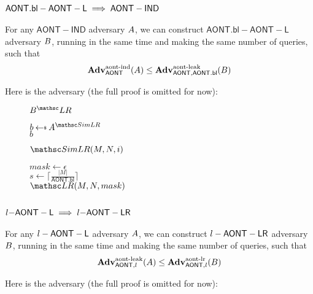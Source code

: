 \documentclass[11pt,twoside]{article}
\begin{document}
\subsection{$\mathsf{AONT.bl-AONT-L}\implies\mathsf{AONT-IND}$}

\begin{theorem}
For any $\mathsf{AONT-IND}$ adversary $A$, we can construct $\mathsf{AONT.bl-AONT-L}$ adversary $B$, running in the same time and making the same number of queries, such that $$\textbf{Adv}^\text{aont-ind}_{\mathsf{AONT}}(A)\le\textbf{Adv}^\text{aont-leak}_{\mathsf{AONT},\mathsf{AONT.bl}}(B)$$
\end{theorem}

Here is the adversary (the full proof is omitted for now):

\begin{figure}[H]
{
\underline{$\advB^\LRO$}

\begin{algorithm}[H]
$b\getsr \advA^{\procfont{SimLR}}$\\
\Return $b$
\end{algorithm}

\underline{$\procfont{SimLR}(M,N,i)$}

\begin{algorithm}[H]
$mask\gets \epsilon$\\
$s\gets \lceil\frac{|M|}{\mathsf{AONT.bl}}\rceil$\\
{
}
\Return $\LRO(M,N,mask)$
\end{algorithm}
}
\end{figure}

\subsection{$l\mathsf{-AONT-L}\implies l\mathsf{-AONT-LR}$}

\begin{theorem}
For any $l-\mathsf{AONT-L}$ adversary $A$, we can construct $l-\mathsf{AONT-LR}$ adversary $B$, running in the same time and making the same number of queries, such that $$\textbf{Adv}^\text{aont-leak}_{\mathsf{AONT},l}(A)\le\textbf{Adv}^\text{aont-lr}_{\mathsf{AONT},l}(B)$$
\end{theorem}

Here is the adversary (the full proof is omitted for now):
\end{document}
